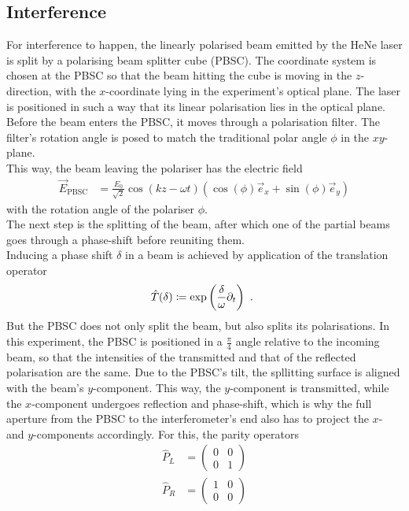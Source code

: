 \subsection{Interference}
\label{sec:Interference}
For interference to happen, the linearly polarised beam emitted by the HeNe laser is split by a polarising beam splitter cube (PBSC). The coordinate system is chosen at the PBSC so that the beam hitting the cube is moving in the $z$-direction, with the $x$-coordinate lying in the experiment's optical plane. The laser is positioned in such a way that its linear polarisation lies in the optical plane.\\
Before the beam enters the PBSC, it moves through a polarisation filter. The filter's rotation angle is posed to match the traditional polar angle $\phi$ in the $x y$-plane.\\
This way, the beam leaving the polariser has the electric field
\begin{align}
  \label{eq:E_pbsc}
  \vec{E}_\text{PBSC} &= \frac{E_0}{\sqrt{2}} \cos\left(kz - \omega t\right) \left( \cos(\phi)\vec{e}_x + \sin(\phi) \vec{e}_y \right)
\end{align}
with the rotation angle of the polariser $\phi$.\\
The next step is the splitting of the beam, after which one of the partial beams goes through a phase-shift before reuniting them.\\
Inducing a phase shift $\delta$ in a beam is achieved by application of the translation operator 
\begin{align}
  \hat T(\delta) \coloneqq \exp\left(\frac{\delta}{\omega} \partial_t\right) \text{ . }
\end{align}
But the PBSC does not only split the beam, but also splits its polarisations. In this experiment, the PBSC is positioned in a $\frac{\pi}{4}$ angle relative to the incoming beam, so that the intensities of the transmitted and that of the reflected polarisation are the same. Due to the PBSC's tilt, the spllitting surface is aligned with the beam's $y$-component. This way, the $y$-component is transmitted, while the $x$-component undergoes reflection and phase-shift, which is why the full aperture from the PBSC to the interferometer's end also has to project the $x$- and $y$-components accordingly. For this, the parity operators 
\begin{align}
  \hat{P}_L &=
  \begin{pmatrix}
      0 & 0 \\
      0 & 1 
  \end{pmatrix} \\
  \hat{P}_R &=
  \begin{pmatrix}
      1 & 0 \\
      0 & 0 
  \end{pmatrix}
\end{align}
